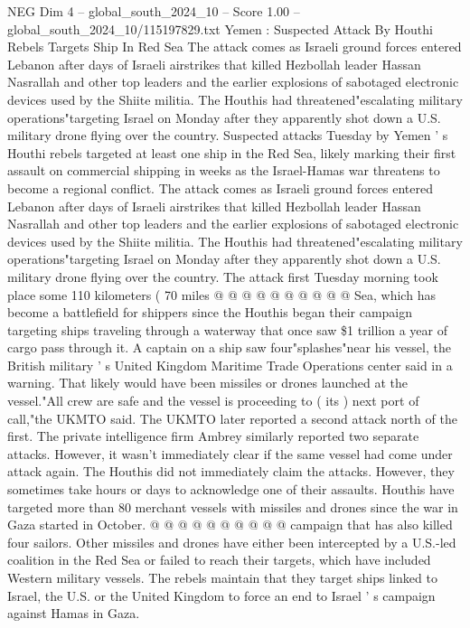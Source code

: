 \begin{textsample}{NEG Dim 4 – global\_south\_2024\_10 – Score 1.00 – global\_south\_2024\_10/115197829.txt}  \label{ex:f4_neg_071}
Yemen : Suspected Attack By Houthi Rebels Targets Ship In Red Sea The attack comes as Israeli ground forces entered Lebanon after days of Israeli airstrikes that killed Hezbollah leader Hassan Nasrallah and other top leaders and the earlier explosions of sabotaged electronic devices used by the Shiite militia.
The Houthis had threatened"escalating military operations"targeting Israel on Monday after they apparently shot down a U.S. military drone flying over the country.
Suspected attacks Tuesday by Yemen ' s Houthi rebels targeted at least one ship in the Red Sea, likely marking their first assault on commercial shipping in weeks as the Israel-Hamas war threatens to become a regional conflict.
The attack comes as Israeli ground forces entered Lebanon after days of Israeli airstrikes that killed Hezbollah leader Hassan Nasrallah and other top leaders and the earlier explosions of sabotaged electronic devices used by the Shiite militia.
The Houthis had threatened"escalating military operations"targeting Israel on Monday after they apparently shot down a U.S. military drone flying over the country.
The attack first Tuesday morning took place some 110 kilometers ( 70 miles @ @ @ @ @ @ @ @ @ @ Sea, which has become a battlefield for shippers since the Houthis began their campaign targeting ships traveling through a waterway that once saw \$1 trillion a year of cargo pass through it.
A captain on a ship saw four"splashes"near his vessel, the British military ' s United Kingdom Maritime Trade Operations center said in a warning.
That likely would have been missiles or drones launched at the vessel."All crew are safe and the vessel is proceeding to ( its ) next port of call,"the UKMTO said.
The UKMTO later reported a second attack north of the first.
The private intelligence firm Ambrey similarly reported two separate attacks.
However, it wasn't immediately clear if the same vessel had come under attack again.
The Houthis did not immediately claim the attacks.
However, they sometimes take hours or days to acknowledge one of their assaults.
Houthis have targeted more than 80 merchant vessels with missiles and drones since the war in Gaza started in October. @ @ @ @ @ @ @ @ @ @ campaign that has also killed four sailors.
Other missiles and drones have either been intercepted by a U.S.-led coalition in the Red Sea or failed to reach their targets, which have included Western military vessels.
The rebels maintain that they target ships linked to Israel, the U.S. or the United Kingdom to force an end to Israel ' s campaign against Hamas in Gaza.

\end{textsample}
